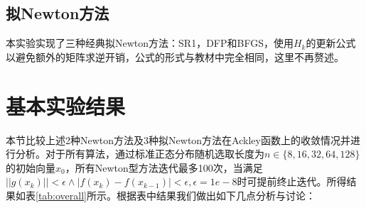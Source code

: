 \documentclass{article}
\begin{document}
\subsection{拟Newton方法}
本实验实现了三种经典拟Newton方法：SR1，DFP和BFGS，使用$H_k$的更新公式以避免额外的矩阵求逆开销，公式的形式与教材中完全相同，这里不再赘述。

\section{基本实验结果}
本节比较上述2种Newton方法及3种拟Newton方法在Ackley函数上的收敛情况并进行分析。对于所有算法，通过标准正态分布随机选取长度为$n\in \{ 8, 16, 32, 64, 128 \}$的初始向量$x_0$，所有Newton型方法迭代最多100次，当满足$||g(x_k)|| < \epsilon \wedge |f(x_{k}) - f(x_{k-1})| < \epsilon, \epsilon=1e-8$时可提前终止迭代。所得结果如表\ref{tab:overall}所示。根据表中结果我们做出如下几点分析与讨论：
\end{document}
